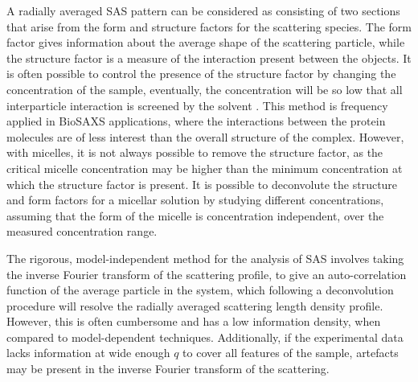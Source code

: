 A radially averaged SAS pattern can be considered as consisting of two sections that arise from the form and structure factors for the scattering species.
The form factor gives information about the average shape of the scattering particle, while the structure factor is a measure of the interaction present between the objects.
It is often possible to control the presence of the structure factor by changing the concentration of the sample, eventually, the concentration will be so low that all interparticle interaction is screened by the solvent \cite{edler_combining_2015}.
This method is frequency applied in BioSAXS applications, where the interactions between the protein molecules are of less interest than the overall structure of the complex.
However, with micelles, it is not always possible to remove the structure factor, as the critical micelle concentration may be higher than the minimum concentration at which the structure factor is present.
It is possible to deconvolute the structure and form factors for a micellar solution by studying different concentrations, assuming that the form of the micelle is concentration independent, over the measured concentration range.

The rigorous, model-independent method for the analysis of SAS involves taking the inverse Fourier transform of the scattering profile, to give an auto-correlation function of the average particle in the system, which following a deconvolution procedure will resolve the radially averaged scattering length density profile.
However, this is often cumbersome and has a low information density, when compared to model-dependent techniques.
Additionally, if the experimental data lacks information at wide enough $q$ to cover all features of the sample, artefacts may be present in the inverse Fourier transform of the scattering.


